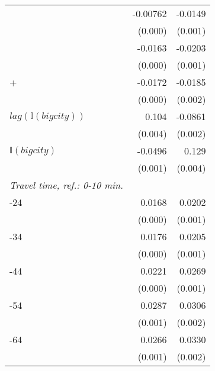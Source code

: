 \begin{table}[htbp]
\begin{tabular}{l*{2}{D{.}{.}{-1}}}
                   &    -0.00762\sym{***}  &     -0.0149\sym{***}\\
                    &      (0.000)  &    (0.001)        \\

                   &     -0.0163\sym{***}  &     -0.0203\sym{***}\\
                    &      (0.000)     &    (0.001)     \\

+                  &     -0.0172\sym{***}  &     -0.0185\sym{***}\\
                    &      (0.000)      &    (0.002)     \\

$lag(\mathbb{I}{(bigcity)})$       &       0.104\sym{***} &     -0.0861\sym{***}\\
                    &      (0.004)     &    (0.002)        \\

$\mathbb{I}{(bigcity)}$      &     -0.0496\sym{***} &       0.129\sym{***}\\
                    &      (0.001)      &     (0.004)     \\
\textit{Travel time, ref.: 0-10 min.} \\

-24               &      0.0168\sym{***} &      0.0202\sym{***}\\
                    &      (0.000)  &     (0.001)        \\

-34               &      0.0176\sym{***}  &      0.0205\sym{***}\\
                    &      (0.000)  &     (0.001)         \\

-44               &      0.0221\sym{***} &      0.0269\sym{***}\\
                    &      (0.000)  &     (0.001)       \\

-54               &      0.0287\sym{***} &      0.0306\sym{***}\\
                    &      (0.001)    &     (0.002)       \\

-64               &      0.0266\sym{***} &      0.0330\sym{***}\\
                    &      (0.001)    &     (0.002)        \\


\end{tabular}
\end{table}
